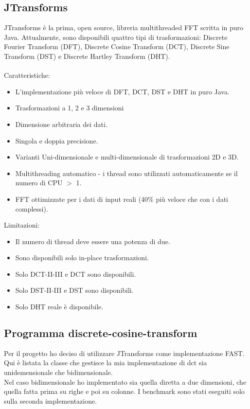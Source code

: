 \documentclass[12pt]{article}
\begin{document}
\subsection{JTransforms}
JTransforms \`e la prima, open source, libreria multithreaded FFT scritta in puro Java. Attualmente, sono disponibili quattro tipi di trasformazioni: Discrete Fourier Transform (DFT), Discrete Cosine Transform (DCT), Discrete Sine Transform (DST) e Discrete Hartley Transform (DHT).\\
\\
Caratteristiche:
\begin{itemize}
\item L'implementazione pi\`u veloce di DFT, DCT, DST e DHT in puro Java.
\item Trasformazioni a 1, 2 e 3 dimensioni
\item Dimensione arbitraria dei dati.
\item Singola e doppia precisione.
\item Varianti Uni-dimensionale e multi-dimensionale di trasformazioni 2D e 3D.
\item Multithreading automatico - i thread sono utilizzati automaticamente se il numero di CPU $>$ 1.
\item FFT ottimizzate per i dati di input reali (40\% pi\`u veloce che con i dati complessi).
\end{itemize}
Limitazioni:
\begin{itemize}
\item Il numero di thread deve essere una potenza di due.
\item Sono disponibili solo in-place trasformazioni.
\item Solo DCT-II-III e DCT sono disponibili.
\item Solo DST-II-III e DST sono disponibili.
\item Solo DHT reale \`e disponibile.
\end{itemize}

\subsection{Programma discrete-cosine-transform}
Per il progetto ho deciso di utilizzare JTransforms come implementazione FAST.\\
Qui \`e listata la classe che gestisce la mia implementazione di dct sia unidemensionale che bidimensionale. \\
Nel caso bidimensionale ho implementato sia quella diretta a due dimensioni, che quella fatta prima su righe e poi su colonne. I benchmark sono stati eseguiti solo sulla seconda implementazione.
\end{document}
